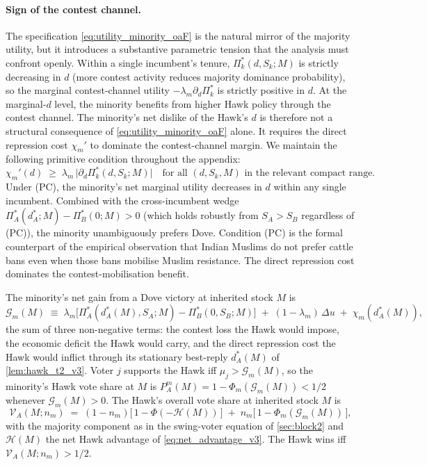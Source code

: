 \documentclass[11pt,twoside]{extarticle}
\begin{document}
\paragraph{Sign of the contest channel.} The specification \eqref{eq:utility_minority_oaF} is the natural mirror of the majority utility, but it introduces a substantive parametric tension that the analysis must confront openly. Within a single incumbent's tenure, $\Pi_k^*(d,S_k;M)$ is strictly decreasing in $d$ (more contest activity reduces majority dominance probability), so the marginal contest-channel utility $-\lambda_m\partial_d\Pi_k^*$ is strictly positive in $d$. At the marginal-$d$ level, the minority benefits from higher Hawk policy through the contest channel. The minority's net dislike of the Hawk's $d$ is therefore not a structural consequence of \eqref{eq:utility_minority_oaF} alone. It requires the direct repression cost $\chi_m'$ to dominate the contest-channel margin. We maintain the following primitive condition throughout the appendix:
\begin{equation}\label{eq:PC_oaF}
    \chi_m'(d)\;\ge\;\lambda_m\,\big|\partial_d\Pi_k^*(d,S_k;M)\big|\quad\text{for all }(d,S_k,M)\text{ in the relevant compact range.}\tag{PC}
\end{equation}
Under (PC), the minority's net marginal utility decreases in $d$ within any single incumbent. Combined with the cross-incumbent wedge $\Pi_A^*(d_A^*;M)-\Pi_B^*(0;M)>0$ (which holds robustly from $S_A>S_B$ regardless of (PC)), the minority unambiguously prefers Dove. Condition (PC) is the formal counterpart of the empirical observation that Indian Muslims do not prefer cattle bans even when those bans mobilise Muslim resistance. The direct repression cost dominates the contest-mobilisation benefit.

The minority's net gain from a Dove victory at inherited stock $M$ is
\begin{equation}\label{eq:Gm_oaF}
    \mathcal G_m(M)\;\equiv\;\lambda_m\big[\Pi_A^*(d_A^*(M),S_A;M)-\Pi_B^*(0,S_B;M)\big]\;+\;(1-\lambda_m)\,\Delta u\;+\;\chi_m(d_A^*(M)),
\end{equation}
the sum of three non-negative terms: the contest loss the Hawk would impose, the economic deficit the Hawk would carry, and the direct repression cost the Hawk would inflict through its stationary best-reply $d_A^*(M)$ of \autoref{lem:hawk_t2_v3}. Voter $j$ supports the Hawk iff $\mu_j>\mathcal G_m(M)$, so the minority's Hawk vote share at $M$ is $P_A^m(M)=1-\Phi_m(\mathcal G_m(M))<1/2$ whenever $\mathcal G_m(M)>0$. The Hawk's overall vote share at inherited stock $M$ is
\begin{equation}\label{eq:VA_oaF}
    \mathcal V_A(M;n_m)\;=\;(1-n_m)\big[\,1-\Phi(-\mathcal H(M))\,\big]\;+\;n_m\big[\,1-\Phi_m(\mathcal G_m(M))\,\big],
\end{equation}
with the majority component as in the swing-voter equation of \autoref{sec:block2} and $\mathcal H(M)$ the net Hawk advantage of \eqref{eq:net_advantage_v3}. The Hawk wins iff $\mathcal V_A(M;n_m)>1/2$.
\end{document}
